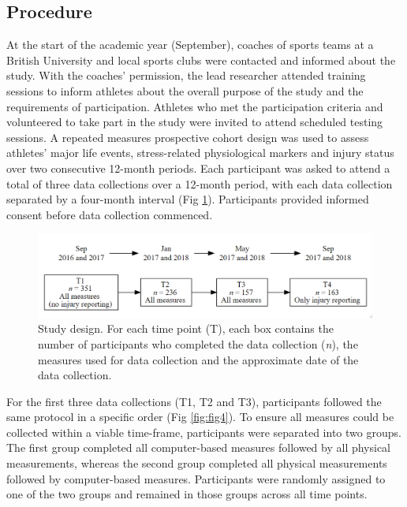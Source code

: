 \documentclass[
  english,
  man,floatsintext]{apa6}
\begin{document}
\hypertarget{procedure}{%
\subsection{Procedure}\label{procedure}}

At the start of the academic year (September), coaches of sports teams at a British University and local sports clubs were contacted and informed about the study. With the coaches' permission, the lead researcher attended training sessions to inform athletes about the overall purpose of the study and the requirements of participation. Athletes who met the participation criteria and volunteered to take part in the study were invited to attend scheduled testing sessions. A repeated measures prospective cohort design was used to assess athletes' major life events, stress-related physiological markers and injury status over two consecutive 12-month periods. Each participant was asked to attend a total of three data collections over a 12-month period, with each data collection separated by a four-month interval (Fig \ref{fig:fig3}). Participants provided informed consent before data collection commenced.

\begin{figure}
\includegraphics[width=1\linewidth]{figures_doc/studydesign_new} \caption{Study design. For each time point (T), each box contains the number of participants who completed the data collection (\textit{n}), the measures used for data collection and the approximate date of the data collection.}\label{fig:fig3}
\end{figure}

For the first three data collections (T1, T2 and T3), participants followed the same protocol in a specific order (Fig \ref{fig:fig4}).
To ensure all measures could be collected within a viable time-frame, participants were separated into two groups.
The first group completed all computer-based measures followed by all physical measurements, whereas the second group completed all physical measurements followed by computer-based measures.
Participants were randomly assigned to one of the two groups and remained in those groups across all time points.
\end{document}
